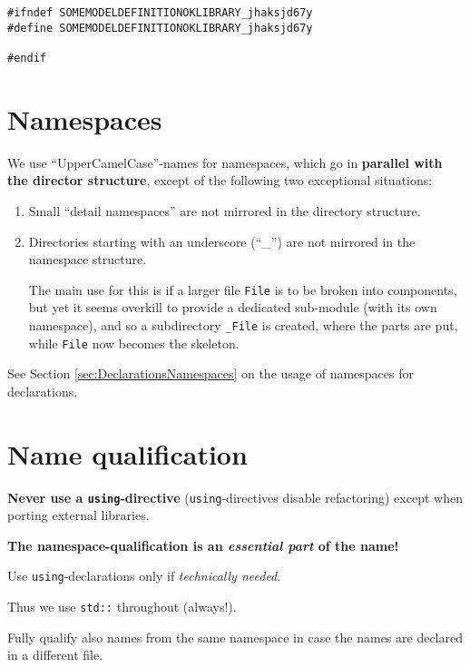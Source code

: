 \documentclass{book}
\newcommand{\filename}[1]{\texttt{#1}}
\begin{document}
\begin{verbatim}
#ifndef SOMEMODELDEFINITIONOKLIBRARY_jhaksjd67y
#define SOMEMODELDEFINITIONOKLIBRARY_jhaksjd67y

#endif
\end{verbatim}




\section{Namespaces}
\label{sec:namespacenames}

We use ``UpperCamelCase''-names for namespaces, which go in \textbf{parallel with the director structure}, except of the following two exceptional situations:
\begin{enumerate}
\item Small ``detail namespaces'' are not mirrored in the directory structure.
\item Directories starting with an underscore (``\_'') are not mirrored in the namespace structure.

  The main use for this is if a larger file \filename{File} is to be broken into components, but yet it seems overkill to provide a dedicated sub-module (with its own namespace), and so a subdirectory \filename{\_File} is created, where the parts are put, while \filename{File} now becomes the skeleton.
\end{enumerate}


See Section \ref{sec:DeclarationsNamespaces} on the usage of namespaces for declarations.




\section{Name qualification}
\label{sec:Namequalification}

\textbf{Never use a \texttt{using}-directive} (\texttt{using}-directives disable refactoring) except when porting external libraries. 

\textbf{The namespace-qualification is an \emph{essential part} of the name!}

Use \texttt{using}-declarations only if \emph{technically needed}.

Thus we use \texttt{std::} throughout (always!).

Fully qualify also names from the same namespace in case the names are declared in a different file.
\end{document}
